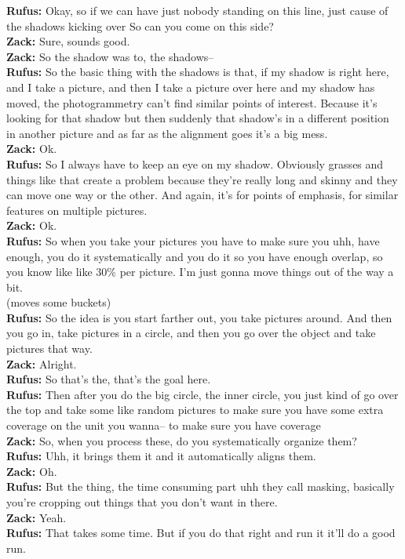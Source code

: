 \documentclass[
]{article}
\begin{document}
\textbf{Rufus:} Okay, so if we can have just nobody standing on this
line, just cause of the shadows kicking over So can you come on this
side?\\
\textbf{Zack:} Sure, sounds good.\\
\textbf{Zack:} So the shadow was to, the shadows--\\
\textbf{Rufus:} So the basic thing with the shadows is that, if my
shadow is right here, and I take a picture, and then I take a picture
over here and my shadow has moved, the photogrammetry can't find similar
points of interest. Because it's looking for that shadow but then
suddenly that shadow's in a different position in another picture and as
far as the alignment goes it's a big mess.\\
\textbf{Zack:} Ok.\\
\textbf{Rufus:} So I always have to keep an eye on my shadow. Obviously
grasses and things like that create a problem because they're really
long and skinny and they can move one way or the other. And again, it's
for points of emphasis, for similar features on multiple pictures.\\
\textbf{Zack:} Ok.\\
\textbf{Rufus:} So when you take your pictures you have to make sure you
uhh, have enough, you do it systematically and you do it so you have
enough overlap, so you know like like 30\% per picture. I'm just gonna
move things out of the way a bit.\\
(moves some buckets)\\
\textbf{Rufus:} So the idea is you start farther out, you take pictures
around. And then you go in, take pictures in a circle, and then you go
over the object and take pictures that way.\\
\textbf{Zack:} Alright.\\
\textbf{Rufus:} So that's the, that's the goal here.\\
\textbf{Rufus:} Then after you do the big circle, the inner circle, you
just kind of go over the top and take some like random pictures to make
sure you have some extra coverage on the unit you wanna-- to make sure
you have coverage\\
\textbf{Zack:} So, when you process these, do you systematically
organize them?\\
\textbf{Rufus:} Uhh, it brings them it and it automatically aligns
them.\\
\textbf{Zack:} Oh.\\
\textbf{Rufus:} But the thing, the time consuming part uhh they call
masking, basically you're cropping out things that you don't want in
there.\\
\textbf{Zack:} Yeah.\\
\textbf{Rufus:} That takes some time. But if you do that right and run
it it'll do a good run.
\end{document}
